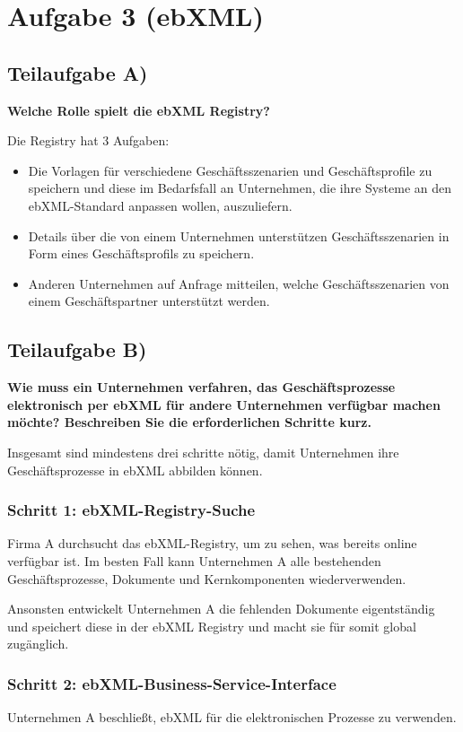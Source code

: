 \section{Aufgabe 3 (ebXML)}

\subsection{Teilaufgabe A)}
\textbf{Welche Rolle spielt die ebXML Registry?}

Die Registry hat 3 Aufgaben:

\begin{itemize}
  \item Die Vorlagen für verschiedene Geschäftsszenarien und Geschäftsprofile zu
speichern und diese im Bedarfsfall an Unternehmen, die ihre Systeme an den
ebXML-Standard anpassen wollen, auszuliefern.
  \item Details über die von einem Unternehmen unterstützen Geschäftsszenarien in
Form eines Geschäftsprofils zu speichern. 
  \item Anderen Unternehmen auf Anfrage mitteilen, welche Geschäftsszenarien von
einem Geschäftspartner unterstützt werden.
\end{itemize}

\subsection{Teilaufgabe B)}
\textbf{Wie muss ein Unternehmen verfahren, das Geschäftsprozesse elektronisch per
ebXML für andere Unternehmen verfügbar machen möchte? Beschreiben Sie die
erforderlichen Schritte kurz.}

Insgesamt sind mindestens drei schritte nötig, damit Unternehmen ihre
Geschäftsprozesse in ebXML abbilden können.

\subsubsection{Schritt 1: ebXML-Registry-Suche}
Firma A durchsucht das ebXML-Registry, um zu sehen, was bereits online
verfügbar ist. Im besten Fall kann Unternehmen A alle bestehenden
Geschäftsprozesse, Dokumente und Kernkomponenten wiederverwenden.

Ansonsten entwickelt Unternehmen A die fehlenden Dokumente eigentständig und
speichert diese in der ebXML Registry und macht sie für somit global zugänglich. 

\subsubsection{Schritt 2: ebXML-Business-Service-Interface}
Unternehmen A beschließt, ebXML für die elektronischen Prozesse zu verwenden. 

